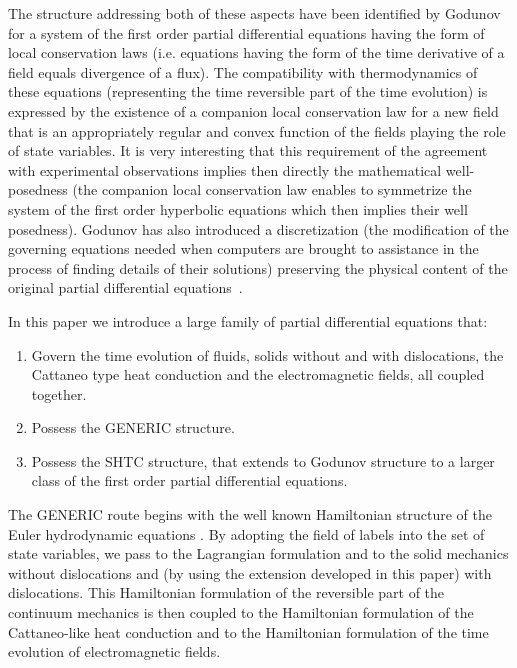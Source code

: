 \documentclass[twoside]{article}
\begin{document}
The structure addressing both of these aspects have been identified by 
Godunov~\cite{God1961,God1962} for a system of the first order 
partial  
differential equations having the form of local conservation laws (i.e. 
equations having the form of the  time derivative of a field equals divergence 
of a flux). The compatibility with thermodynamics of these equations 
(representing the time reversible part of the time evolution) is expressed by 
the existence of a companion local conservation law for a new field that is an 
appropriately  regular and convex function of the fields playing the role of 
state variables. It is very interesting that this requirement of the agreement 
with experimental observations implies then directly the mathematical 
well-posedness (the companion local conservation law enables to symmetrize the  
system of the first order hyperbolic equations which then implies their well 
posedness). Godunov has  also introduced a discretization (the modification of 
the governing equations needed when computers are brought to assistance in the 
process of finding details of their solutions) preserving the physical content 
of the original partial differential equations~\cite{God1959}.

In this paper we introduce a large family of partial differential equations 
that:
\begin{enumerate}
\item Govern the time evolution of fluids, solids without and with 
dislocations,  the Cattaneo type heat conduction and the electromagnetic 
fields, all coupled together.
\item Possess the GENERIC structure.
\item Possess the SHTC structure, that extends to Godunov structure to a larger 
class of the first order partial differential equations.
\end{enumerate}

The GENERIC route begins with the well known Hamiltonian structure of the Euler 
hydrodynamic equations \cite{Clebsch,Arnold1}. By adopting the field 
of labels into the set of state variables, we pass to the Lagrangian 
formulation and to the solid mechanics without dislocations 
\cite{Miroslav-PLA} and  (by using  the extension developed in this paper) 
with dislocations. This Hamiltonian  formulation of the reversible part of the 
continuum mechanics is then coupled to the Hamiltonian formulation of the 
Cattaneo-like heat conduction and  to the Hamiltonian formulation of the time 
evolution of electromagnetic fields.
\end{document}

